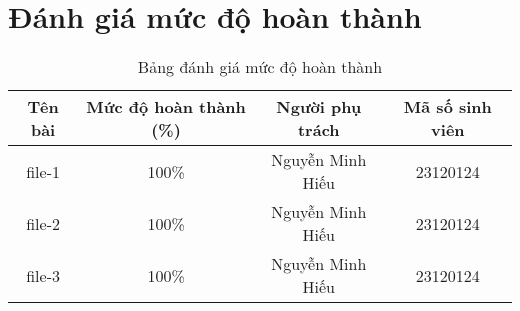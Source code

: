 \section{Đánh giá mức độ hoàn thành}

\begin{table}[H]
    \centering
    \begin{tabular}{|c|c|c|c|}
    \hline
    \textbf{Tên bài} & \textbf{Mức độ hoàn thành (\%)} & \textbf{Người phụ trách} & \textbf{Mã số sinh viên} \\ \hline
    file-1 & 100\% & Nguyễn Minh Hiếu & 23120124 \\ \hline
    file-2 & 100\% & Nguyễn Minh Hiếu & 23120124 \\ \hline
    file-3 & 100\% & Nguyễn Minh Hiếu & 23120124 \\ \hline
    \end{tabular}
    \caption{Bảng đánh giá mức độ hoàn thành}
    \label{tab:hoanthanh}
\end{table}